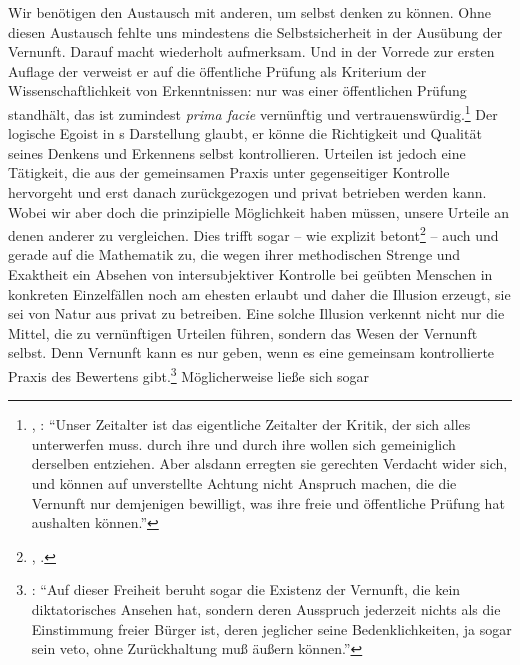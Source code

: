 Wir benötigen den Austausch mit anderen, um selbst denken zu
können. Ohne diesen Austausch fehlte uns mindestens die Selbstsicherheit in der
Ausübung der Vernunft. Darauf macht  wiederholt aufmerksam. Und in
der Vorrede zur ersten Auflage der  verweist
er auf die öffentliche Prüfung als Kriterium der Wissenschaftlichkeit von
Erkenntnissen: nur was einer öffentlichen Prüfung standhält, das ist zumindest
\emph{prima facie} vernünftig und vertrauenswürdig.\footnote{\cite[Vgl.][A
xi]{Kant:KritikderreinenVernunft2003}, \cite[][IV:
9.33--38]{Kant:GesammelteWerke1900ff.}: \enquote{Unser Zeitalter ist das
eigentliche Zeitalter der Kritik, der sich alles unterwerfen muss.
 durch ihre  und  durch ihre
 wollen sich gemeiniglich derselben entziehen. Aber alsdann
erregten sie gerechten Verdacht wider sich, und können auf unverstellte Achtung
nicht Anspruch machen, die die Vernunft nur demjenigen bewilligt, was ihre freie
und öffentliche Prüfung hat aushalten können.}}
Der logische Egoist in s Darstellung glaubt, er könne die Richtigkeit
und Qualität seines Denkens und Erkennens selbst kontrollieren. Urteilen ist
jedoch eine Tätigkeit, die aus der gemeinsamen Praxis unter gegenseitiger
Kontrolle hervorgeht und erst danach zurückgezogen und privat betrieben werden
kann. Wobei wir aber doch die prinzipielle Möglichkeit haben müssen, unsere
Urteile an denen anderer zu vergleichen. Dies trifft sogar -- wie
 explizit
betont\footnote{\cite[Vgl.][\S~2]{Kant:AnthropologieinpragmatischerHinsicht1977},
\cite[][VII: 129.3--8]{Kant:GesammelteWerke1900ff.}.} -- auch und gerade auf die
Mathematik zu, die wegen ihrer methodischen Strenge und Exaktheit ein Absehen
von intersubjektiver Kontrolle bei geübten Menschen in konkreten Einzelfällen
noch am ehesten erlaubt und daher die Illusion erzeugt, sie sei von Natur aus privat
zu betreiben. Eine solche Illusion verkennt nicht nur die Mittel, die zu
vernünftigen Urteilen führen, sondern das Wesen der Vernunft selbst. Denn
Vernunft kann es nur geben, wenn es eine gemeinsam kontrollierte Praxis des
Bewertens gibt.\footnote{\cite[Vgl.][B
766f.,]{Kant:KritikderreinenVernunft2003} \cite[][III:
484.10--14]{Kant:GesammelteWerke1900ff.}: \enquote{Auf dieser Freiheit beruht
sogar die Existenz der Vernunft, die kein diktatorisches Ansehen hat, sondern
deren Ausspruch jederzeit nichts als die Einstimmung freier Bürger ist, deren
jeglicher seine Bedenklichkeiten, ja sogar sein veto, ohne Zurückhaltung muß
äußern können.}} Möglicherweise ließe sich sogar
